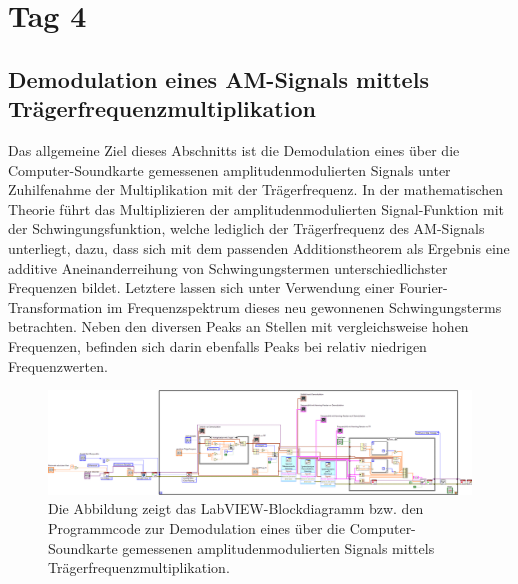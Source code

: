 \documentclass[
a4paper,
12pt,
pagesize,
ngerman
]{scrartcl}
\begin{document}

	\section{Tag 4}
	
	\subsection{Demodulation eines AM-Signals mittels Trägerfrequenzmultiplikation} \label{DemodTraeger}
	Das allgemeine Ziel dieses Abschnitts ist die Demodulation eines über die Computer-Soundkarte gemessenen amplitudenmodulierten Signals unter Zuhilfenahme der Multiplikation mit der Trägerfrequenz. 
	In der mathematischen Theorie führt das Multiplizieren der amplitudenmodulierten Signal-Funktion mit der Schwingungsfunktion, welche lediglich der Trägerfrequenz des AM-Signals unterliegt, dazu, dass sich mit dem passenden Additionstheorem als Ergebnis eine additive Aneinanderreihung von Schwingungstermen unterschiedlichster Frequenzen bildet. 
	Letztere lassen sich unter Verwendung einer Fourier-Transformation im Frequenzspektrum dieses neu gewonnenen Schwingungsterms betrachten. 
	Neben den diversen Peaks an Stellen mit vergleichsweise hohen Frequenzen, befinden sich darin ebenfalls Peaks bei relativ niedrigen Frequenzwerten.
		
	\begin{figure}[H]
		\centering
		\includegraphics[width=1.0\textwidth]{EIRE2018Dateien/Tag4/traegerMultOszi/Oszilloskop__modifiziertd}
		\caption{Die Abbildung zeigt das LabVIEW-Blockdiagramm bzw. den Programmcode zur Demodulation eines über die Computer-Soundkarte gemessenen amplitudenmodulierten Signals mittels Trägerfrequenzmultiplikation.}
		\label{MultiTraegerProgrammcode}
	\end{figure}
\end{document}
